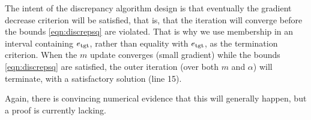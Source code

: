 The intent of the discrepancy algorithm design is that eventually the gradient decrease criterion will be satisfied, that is, that the iteration will converge before the bounds \ref{eqn:discrepsq} are violated. That is why we use membership in an interval containing $e_{\rm tgt}$, rather than equality with $e_{\rm tgt}$, as the termination criterion. When the $m$ update converges (small gradient) while the bounds \ref{eqn:discrepsq} are satisfied, the outer iteration (over both $m$ and $\alpha$) will terminate, with a satisfactory solution (line 15).

Again, there is convincing numerical evidence that this will generally happen, but a proof is currently lacking.

